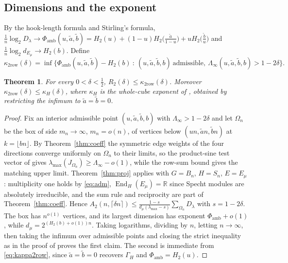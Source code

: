 \documentclass[11pt]{amsart}
\newtheorem{theorem}{Theorem}[section]
\theoremstyle{definition}
\newcommand{\R}{\mathbb R}
\newcommand{\End}{\operatorname{End}}
\newcommand{\Htwo}{H_2}
\begin{document}
\subsection{Dimensions and the exponent}
By the hook-length formula and Stirling's formula, $\frac1n\log_2D_\lambda\to\Phi_{\mathrm{amb}}(u,\tilde a,\tilde b)=\Htwo(u)+(1-u)\Htwo\big(\tfrac{\tilde a}{1-u}\big)+u\Htwo\big(\tfrac{\tilde b}u\big)$ and $\frac1n\log_2 d_{E_\mu}\to\Htwo(b)$. Define
\begin{equation}\label{eq:kappa2row}
\kappa_{2\mathrm{row}}(\delta)=\inf\Big\{\Phi_{\mathrm{amb}}(u,\tilde a,\tilde b)-\Htwo(b)\ :\ (u,\tilde a,\tilde b,b)\ \text{admissible},\ \Lambda_\infty(u,\tilde a,\tilde b,b)>1-2\delta\Big\}.
\end{equation}

\begin{theorem}\label{thm:exponent}
For every $0<\delta<\tfrac12$, $R_2(\delta)\le\kappa_{2\mathrm{row}}(\delta)$. Moreover $\kappa_{2\mathrm{row}}(\delta)\le\kappa_H(\delta)$, where $\kappa_H$ is the whole-cube exponent of \cite{OAI2026}, obtained by restricting the infimum to $\tilde a=\tilde b=0$.
\end{theorem}

\begin{proof}
Fix an interior admissible point $(u,\tilde a,\tilde b,b)$ with $\Lambda_\infty>1-2\delta$ and let $\Omega_n$ be the box of side $m_n\to\infty$, $m_n=o(n)$, of vertices below $(un,\tilde an,\tilde bn)$ at $k=\lfloor bn\rfloor$. By Theorem~\ref{thm:coeff} the symmetric edge weights of the four directions converge uniformly on $\Omega_n$ to their limits, so the product-sine test vector of \cite[Lemma~7.2]{OAI2026} gives $\lambda_{\max}(J_{\Omega_n})\ge\Lambda_\infty-o(1)$, while the row-sum bound gives the matching upper limit. Theorem~\ref{thm:proj} applies with $G=B_n$, $H=S_n$, $E=E_\mu$: multiplicity one holds by \eqref{eq:adm}, $\End_H(E_\mu)=\R$ since Specht modules are absolutely irreducible, and the sum rule and reciprocity are part of Theorem~\ref{thm:coeff}. Hence $A_2(n,\lceil\delta n\rceil)\le\frac{1-s}{d_\mu(\lambda_{\max}-s)}\sum_{\Omega_n}D_\lambda$ with $s=1-2\delta$. The box has $n^{o(1)}$ vertices, and its largest dimension has exponent $\Phi_{\mathrm{amb}}+o(1)$, while $d_\mu=2^{(\Htwo(b)+o(1))n}$. Taking logarithms, dividing by $n$, letting $n\to\infty$, then taking the infimum over admissible points and closing the strict inequality as in the proof of \cite[Thm.~1.2]{OAI2026} proves the first claim. The second is immediate from \eqref{eq:kappa2row}, since $\tilde a=\tilde b=0$ recovers $\Gamma_H$ and $\Phi_{\mathrm{amb}}=\Htwo(u)$.
\end{proof}
\end{document}
